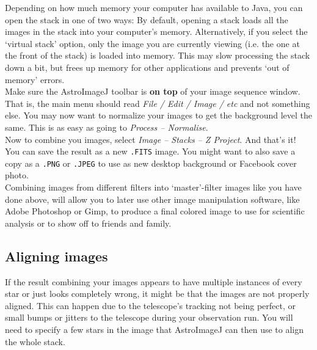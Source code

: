\documentclass[12pt,twoside,a4paper]{report}
\begin{document}
Depending on how much memory your computer has available to Java, you can open the stack in one of two ways: By default, opening a stack loads all the images in the stack into your computer's memory. Alternatively, if you select the `virtual stack' option, only the image you are currently viewing (i.e. the one at the front of the stack) is loaded into memory. This may slow processing the stack down a bit, but frees up memory for other applications and prevents `out of memory' errors.\\

Make sure the AstroImageJ toolbar is \textbf{on top} of your image sequence window. That is, the main menu should read \emph{File / Edit / Image / etc} and not something else. You may now want to normalize your images to get the background level the same. This is as easy as going to \emph{Process -- Normalise}.\\ 

Now to combine you images, select \emph{Image -- Stacks -- Z Project}. And that's it! You can save the result as a new {\tt .FITS} image. You might want to also save a copy as a {\tt .PNG} or {\tt .JPEG} to use as new desktop background or Facebook cover photo.\\

Combining images from different filters into `master'-filter images like you have done above, will allow you to later use other image manipulation software, like Adobe Photoshop or Gimp, to produce a final colored image to use for scientific analysis or to show off to friends and family.

\subsection{Aligning images}

If the result combining your images appears to have multiple instances of every star or just looks completely wrong, it might be that the images are not properly aligned. This can happen due to the telescope's tracking not being perfect, or small bumps or jitters to the telescope during your observation run. You will need to specify a few stars in the image that AstroImageJ can then use to align the whole stack.\\
\end{document}
